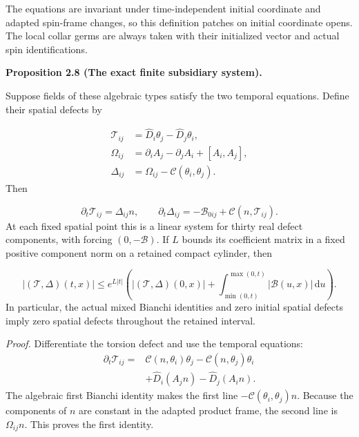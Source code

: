 \documentclass[
  english,
  11pt,
  reqno]{amsart}
\makeatletter
\newcommand{\pandocstatementheading}[1]{%
  \par\addpenalty{\@beginparpenalty}%
  \addvspace{.5\baselineskip plus .2\baselineskip minus .2\baselineskip}%
  {\normalfont\bfseries #1\par}%
  \nobreak\@afterindenttrue\@afterheading
}
\makeatother
\begin{document}
The equations are invariant under time-independent initial coordinate
and adapted spin-frame changes, so this definition patches on initial
coordinate opens. The local collar germs are always taken with their
initialized vector and actual spin identifications.

\pandocstatementheading{\leavevmode{}\label{prop:online-cartan-subsidiary-system}Proposition 2.8 (The exact finite subsidiary system).}

Suppose fields of these algebraic types satisfy the two temporal
equations. Define their spatial defects by

\label{eq:online-cartan-spatial-defects} \[
\begin{aligned}
\mathcal T_{ij}
&=\widehat D_i\theta_j-\widehat D_j\theta_i,\\
\Omega_{ij}
&=\partial_i A_j-\partial_j A_i+[A_i,A_j],\\
\Delta_{ij}
&=\Omega_{ij}-\mathcal C(\theta_i,\theta_j).
\end{aligned}
\] Then

\label{eq:online-cartan-closed-subsidiary-system} \[
\partial_t\mathcal T_{ij}=\Delta_{ij}n,
\qquad
\partial_t\Delta_{ij}
=-\mathcal B_{0ij}+\mathcal C(n,\mathcal T_{ij}).
\] At each fixed spatial point this is a linear system for thirty real
defect components, with forcing \((0,-\mathcal B)\). If \(L\) bounds its
coefficient matrix in a fixed positive component norm on a retained
compact cylinder, then

\label{eq:online-cartan-forced-defect-estimate} \[
|(\mathcal T,\Delta)(t,x)|
\le e^{L|t|}
\left(
|(\mathcal T,\Delta)(0,x)|
+\int_{\min(0,t)}^{\max(0,t)}
|\mathcal B(u,x)|\,\mathrm du
\right).
\] In particular, the actual mixed Bianchi identities and zero initial
spatial defects imply zero spatial defects throughout the retained
interval.

\emph{Proof.} Differentiate the torsion defect and use the temporal
equations: \[
\begin{aligned}
\partial_t\mathcal T_{ij}
={}&\mathcal C(n,\theta_i)\theta_j
-\mathcal C(n,\theta_j)\theta_i\\
&+\widehat D_i(A_jn)-\widehat D_j(A_in).
\end{aligned}
\] The algebraic first Bianchi identity makes the first line
\(-\mathcal C(\theta_i,\theta_j)n\). Because the components of \(n\) are
constant in the adapted product frame, the second line is
\(\Omega_{ij}n\). This proves the first identity.
\end{document}
